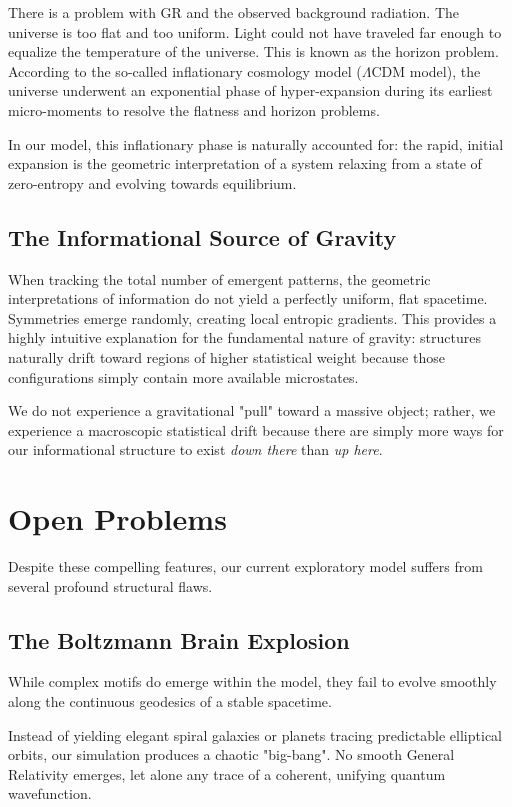 There is a problem with GR and the observed background radiation. 
The universe is too flat and too uniform. 
Light could not have traveled far enough to equalize the temperature of the universe. 
This is known as the horizon problem. According to the so-called inflationary cosmology model ($\Lambda\text{CDM}$ model), 
the universe underwent an exponential phase of hyper-expansion during its earliest micro-moments to resolve the flatness and horizon problems. 

In our model, this inflationary phase is naturally accounted for: the rapid, initial expansion is the geometric interpretation of a system relaxing from a state of 
zero-entropy and evolving towards equilibrium.


\subsection*{The Informational Source of Gravity}

When tracking the total number of emergent patterns, the geometric interpretations of information do not yield a perfectly uniform, flat spacetime. 
Symmetries emerge randomly, creating local entropic gradients. This provides a highly intuitive explanation for the fundamental nature of gravity: 
structures naturally drift toward regions of higher statistical weight because those configurations simply contain more available microstates. 

We do not experience a gravitational "pull" toward a massive object; rather, we experience a macroscopic statistical drift because there are simply more ways for our 
informational structure to exist \textit{down there} than  \textit{up here}.


\section{Open Problems}

Despite these compelling features, our current exploratory model suffers from several profound structural flaws.

\subsection*{The Boltzmann Brain Explosion}

While complex motifs do emerge within the model, they fail to evolve smoothly along the continuous geodesics of a stable spacetime.

Instead of yielding elegant spiral galaxies or planets tracing predictable elliptical orbits, our simulation produces a chaotic "big-bang". 
No smooth General Relativity emerges, let alone any trace of a coherent, unifying quantum wavefunction. 

